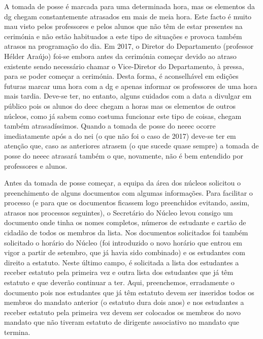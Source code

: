 A tomada de posse é marcada para uma determinada hora, mas os elementos da \acrshort{dg} chegam constantemente atrasados em mais de meia hora. Este facto é muito mau visto pelos professores e pelos alunos que não têm de estar presentes na cerimónia e não estão habituados a este tipo de situações e provoca também atrasos na programação do dia. Em 2017, o Diretor do Departamento (professor Hélder Araújo) foi-se embora antes da cerimónia começar devido ao atraso existente sendo necessário chamar o Vice-Diretor do Departamento, à pressa, para se poder começar a cerimónia. Desta forma, é aconselhável em edições futuras marcar uma hora com a \acrshort{dg} e apenas informar os professores de uma hora mais tardia. Deve-se ter, no entanto, alguns cuidados com a data a divulgar em público pois os alunos do \acrshort{deec} chegam a horas mas os elementos de outros núcleos, como já sabem como costuma funcionar este tipo de coisas, chegam também atrasadíssimos. Quando a tomada de posse do \acrshort{neeec} ocorre imediatamente após a do \acrshort{nei} (o que não foi o caso de 2017) deve-se ter em atenção que, caso as anteriores atrasem (o que sucede quase sempre) a tomada de posse do \acrshort{neeec} atrasará também o que, novamente, não é bem entendido por professores e alunos.

Antes da tomada de posse começar, a equipa da área dos núcleos solicitou o preenchimento de alguns documentos com algumas informações. Para facilitar o processo (e para que os documentos ficassem logo preenchidos evitando, assim, atrasos nos processos seguintes), o Secretário do Núcleo levou consigo um documento onde tinha os nomes completos, números de estudante e cartão de cidadão de todos os membros da lista. Nos documentos solicitados foi também solicitado o horário do Núcleo (foi introduzido o novo horário que entrou em vigor a partir de setembro, que já havia sido combinado) e os estudantes com direito a estatuto. Neste último campo, é solicitada a lista dos estudantes a receber estatuto pela primeira vez e outra lista dos estudantes que já têm estatuto e que deverão continuar a ter. Aqui, preenchemos, erradamente o documento pois nos estudantes que já têm estatuto devem ser inseridos todos os membros do mandato anterior (o estatuto dura dois anos) e nos estudantes a receber estatuto pela primeira vez devem ser colocados os membros do novo mandato que não tiveram estatuto de dirigente associativo no mandato que termina.


